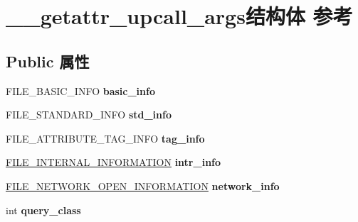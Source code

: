 \hypertarget{struct____getattr__upcall__args}{}\section{\+\_\+\+\_\+getattr\+\_\+upcall\+\_\+args结构体 参考}
\label{struct____getattr__upcall__args}
\subsection*{Public 属性}
\begin{DoxyCompactItemize}
\item 
\mbox{\label{struct____getattr__upcall__args_a68b54d957019e3132b921747b80b65b5}} 
F\+I\+L\+E\+\_\+\+B\+A\+S\+I\+C\+\_\+\+I\+N\+FO {\bfseries basic\+\_\+info}
\item 
\mbox{\label{struct____getattr__upcall__args_a441490db9ff27937574c25ea7086a8a2}} 
F\+I\+L\+E\+\_\+\+S\+T\+A\+N\+D\+A\+R\+D\+\_\+\+I\+N\+FO {\bfseries std\+\_\+info}
\item 
\mbox{\label{struct____getattr__upcall__args_ae2a96685fd52cad4d9f3f6579e704f35}} 
F\+I\+L\+E\+\_\+\+A\+T\+T\+R\+I\+B\+U\+T\+E\+\_\+\+T\+A\+G\+\_\+\+I\+N\+FO {\bfseries tag\+\_\+info}
\item 
\mbox{\label{struct____getattr__upcall__args_a65274ff8a37ca197a2c95f57ea9240c2}} 
\hyperlink{struct___f_i_l_e___i_n_t_e_r_n_a_l___i_n_f_o_r_m_a_t_i_o_n}{F\+I\+L\+E\+\_\+\+I\+N\+T\+E\+R\+N\+A\+L\+\_\+\+I\+N\+F\+O\+R\+M\+A\+T\+I\+ON} {\bfseries intr\+\_\+info}
\item 
\mbox{\label{struct____getattr__upcall__args_af84e01e254bafe94d480a6fb7d9a4fc3}} 
\hyperlink{struct___f_i_l_e___n_e_t_w_o_r_k___o_p_e_n___i_n_f_o_r_m_a_t_i_o_n}{F\+I\+L\+E\+\_\+\+N\+E\+T\+W\+O\+R\+K\+\_\+\+O\+P\+E\+N\+\_\+\+I\+N\+F\+O\+R\+M\+A\+T\+I\+ON} {\bfseries network\+\_\+info}
\item 
\mbox{\label{struct____getattr__upcall__args_a13536f6fd26fa903d50195678b7fae89}} 
int {\bfseries query\+\_\+class}
\item 

\end{DoxyCompactItemize}
